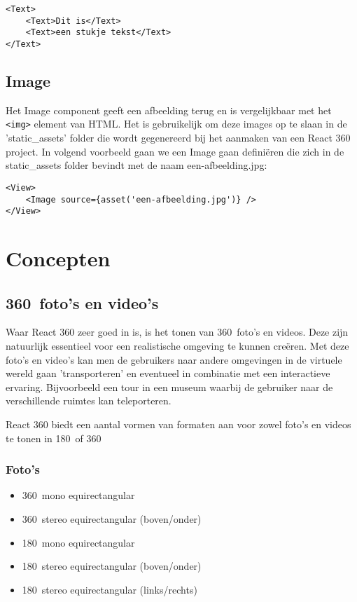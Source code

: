 \begin{lstlisting}[frame=single, caption=Het Text component met kinderen.]
<Text>
	<Text>Dit is</Text>
	<Text>een stukje tekst</Text>
</Text>
\end{lstlisting}

\subsection{Image}
\label{subsec:image}
Het Image component geeft een afbeelding terug en is vergelijkbaar met het \lstinline[basicstyle=\ttfamily\color{red}]|<img>| element van HTML. Het is gebruikelijk om deze images op te slaan in de 'static\_assets' folder die wordt gegenereerd bij het aanmaken van een React 360 project. In volgend voorbeeld gaan we een Image gaan definiëren die zich in de static\_assets folder bevindt met de naam een-afbeelding.jpg:

\begin{lstlisting}[frame=single, caption=Het Image component met als bron een-afbeelding.jpg.]
<View>
	<Image source={asset('een-afbeelding.jpg')} />
</View>
\end{lstlisting}

\section{Concepten}

\subsection{360\textdegree\ foto's en video's}
\label{subsec:360-photo-video}
Waar React 360 zeer goed in is, is het tonen van 360\textdegree\ foto's en videos. Deze zijn natuurlijk essentieel voor een realistische omgeving te kunnen creëren. Met deze foto's en video's kan men de gebruikers naar andere omgevingen in de virtuele wereld gaan 'transporteren' en eventueel in combinatie met een interactieve ervaring. Bijvoorbeeld een tour in een museum waarbij de gebruiker naar de verschillende ruimtes kan teleporteren.

React 360 biedt een aantal vormen van formaten aan voor zowel foto's en videos te tonen in 180\textdegree\ of 360\textdegree\:

\subsubsection{Foto's}
\begin{itemize}
	\item 360\textdegree\ mono equirectangular
	\item 360\textdegree\ stereo equirectangular (boven/onder)
	\item 180\textdegree\ mono equirectangular
	\item 180\textdegree\ stereo equirectangular (boven/onder)
	\item 180\textdegree\ stereo equirectangular (links/rechts)
\end{itemize}

